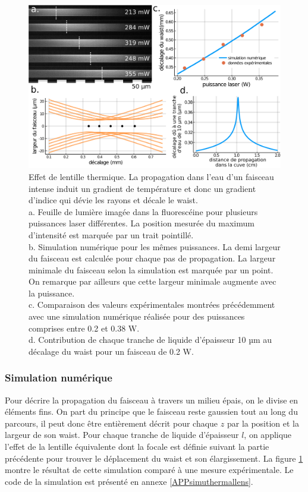\begin{figure}
\centering
\includegraphics[width=\textwidth]{./files/thermal_shift_model.svg.png}
\caption{Effet de lentille thermique. La propagation dans l'eau d'un faisceau intense induit un gradient de température et donc un gradient d'indice qui dévie les rayons et décale le waist.
\\ a. Feuille de lumière imagée dans la fluorescéine pour plusieurs puissances laser différentes. La position mesurée du maximum d'intensité est marquée par un trait pointillé.
\\ b. Simulation numérique pour les mêmes puissances. La demi largeur du faisceau est calculée pour chaque pas de propagation. La largeur minimale du faisceau selon la simulation est marquée par un point. On remarque par ailleurs que cette largeur minimale augmente avec la puissance.
\\ c. Comparaison des valeurs expérimentales montrées précédemment avec une simulation numérique réalisée pour des puissances comprises entre 0.2 et 0.38 W.
\\ d. Contribution de chaque tranche de liquide d'épaisseur 10 µm au décalage du waist pour un faisceau de 0.2 W.
\label{FIGthermalfluorescine}}
\end{figure}

\subsubsection{Simulation numérique}\label{simuthermallens}

Pour décrire la propagation du faisceau à travers un milieu épais, on le divise en éléments fins.
On part du principe que le faisceau reste gaussien tout au long du parcours, il peut donc être entièrement décrit pour chaque $z$ par la position et la largeur de son waist. Pour chaque tranche de liquide d'épaisseur $l$, on applique l'effet de la lentille équivalente dont la focale est définie suivant la partie précédente pour trouver le déplacement du waist et son élargissement. La figure \ref{FIGthermalfluorescine} montre le résultat de cette simulation comparé à une mesure expérimentale. Le code de la simulation est présenté en annexe \ref{APPsimuthermallens}.

